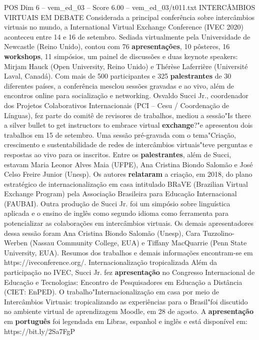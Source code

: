 \begin{textsample}{POS Dim 6 – vem\_ed\_03 – Score 6.00 – vem\_ed\_03/t011.txt}  \label{ex:f6_pos_011}
INTERCÂMBIOS VIRTUAIS EM DEBATE Considerada a principal conferência sobre intercâmbios virtuais no mundo, a International Virtual Exchange Conference (IVEC 2020) aconteceu entre 14 e 16 de setembro.
Sediada virtualmente pela Universidade de Newcastle (Reino Unido), contou com 76 \textbf{apresentações}, 10 pôsteres, 16 \textbf{workshops}, 11 simpósios, um painel de discussões e duas keynote speakers: Mirjam Hauck (Open University, Reino Unido) e Thérèse Laferrière (Université Laval, Canadá).
Com mais de 500 participantes e 325 \textbf{palestrantes} de 30 diferentes países, a conferência mesclou sessões gravadas e ao vivo, além de encontros online para socialização e networking.
Osvaldo Succi Jr., coordenador dos Projetos Colaborativos Internacionais (PCI – Cesu / Coordenação de Línguas), fez parte do comitê de revisores de trabalhos, mediou a sessão"Is there a silver bullet to get instructors to embrace virtual \textbf{exchange}?"e apresentou dois trabalhos em 15 de setembro.
Uma sessão pré-gravada com o tema"Criação, crescimento e sustentabilidade de redes de intercâmbios virtuais"teve perguntas e respostas ao vivo para os inscritos.
Entre os \textbf{palestrantes}, além de Succi, estavam Maria Leonor Alves Maia (UFPE), Ana Cristina Biondo Salomão e José Celso Freire Junior (Unesp).
Os autores \textbf{relataram} a criação, em 2018, do plano estratégico de internacionalização em casa intitulado BRaVE (Brazilian Virtual Exchange Program) pela Associação Brasileira para Educação Internacional (FAUBAI).
Outra produção de Succi Jr. foi um simpósio sobre linguística aplicada e o ensino de inglês como segundo idioma como ferramenta para potencializar as colaborações em intercâmbios virtuais.
Os demais apresentadores dessa sessão foram Ana Cristina Biondo Salomão (Unesp), Cara Tuzzolino-Werben (Nassau Community College, EUA) e Tiffany MacQuarrie (Penn State University, EUA).
Resumos dos trabalhos e demais informações encontram-se em https://iveconference.org/.
Internacionalização tropicalizada Além da participação no IVEC, Succi Jr. fez \textbf{apresentação} no Congresso Internacional de Educação e Tecnologias: Encontro de Pesquisadores em Educação a Distância (CIET: EnPED).
O trabalho"Internacionalização em casa por meio de Intercâmbios Virtuais: tropicalizando as experiências para o Brasil"foi discutido no ambiente virtual de aprendizagem Moodle, em 28 de agosto.
A \textbf{apresentação} em \textbf{português} foi legendada em Libras, espanhol e inglês e está disponível em: https://bit.ly/2Sa7FgP

\end{textsample}
